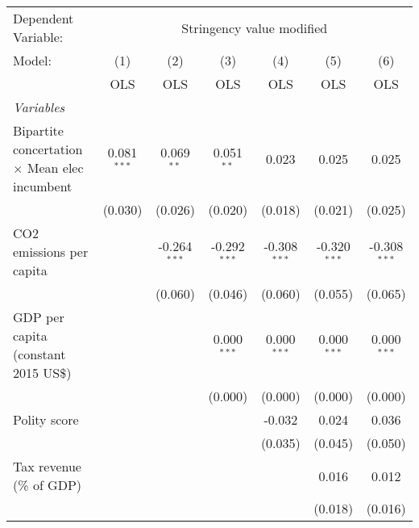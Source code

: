 
\begingroup
\centering
\begin{tabular}{lcccccc}
   \toprule
   Dependent Variable: & \multicolumn{6}{c}{Stringency value modified}\\
   Model:                                               & (1)           & (2)            & (3)            & (4)            & (5)            & (6)\\  
                                                        &  OLS          & OLS            & OLS            & OLS            & OLS            & OLS\\  
   \midrule
   \emph{Variables}\\
   Bipartite concertation $\times$ Mean elec incumbent  & 0.081$^{***}$ & 0.069$^{**}$   & 0.051$^{**}$   & 0.023          & 0.025          & 0.025\\   
                                                        & (0.030)       & (0.026)        & (0.020)        & (0.018)        & (0.021)        & (0.025)\\   
   CO2 emissions per capita                             &               & -0.264$^{***}$ & -0.292$^{***}$ & -0.308$^{***}$ & -0.320$^{***}$ & -0.308$^{***}$\\   
                                                        &               & (0.060)        & (0.046)        & (0.060)        & (0.055)        & (0.065)\\   
   GDP per capita (constant 2015 US\$)                  &               &                & 0.000$^{***}$  & 0.000$^{***}$  & 0.000$^{***}$  & 0.000$^{***}$\\   
                                                        &               &                & (0.000)        & (0.000)        & (0.000)        & (0.000)\\   
   Polity score                                         &               &                &                & -0.032         & 0.024          & 0.036\\   
                                                        &               &                &                & (0.035)        & (0.045)        & (0.050)\\   
   Tax revenue (\% of GDP)                              &               &                &                &                & 0.016          & 0.012\\   
                                                        &               &                &                &                & (0.018)        & (0.016)\\   

\end{tabular}

